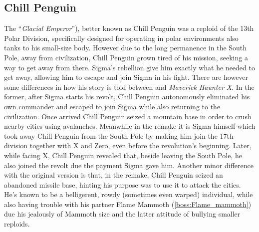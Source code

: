 \subsection{Chill Penguin}\label{boss:Chill_Penguin}
The ``\textit{Glacial Emperor}''\cite{book:MMX_Complete_art}), better known as Chill Penguin was a reploid of the 13th Polar Division, specifically designed for operating in polar environments also tanks to his small-size body. However due to the long permanence in the South Pole, away from civilization, Chill Penguin grown tired of his mission, seeking a way to get away from there. Sigma's rebellion give him exactly what he needed to get away, allowing him to escape and join Sigma in his fight. There are however some differences in how his story is told between \x and \textit{Maverick Haunter X}. In the former, after Sigma starts his revolt, Chill Penguin autonomously eliminated his own commander and escaped to join Sigma while also returning to the civilization\cite{Xcoll1:Manual_X1}. Once arrived Chill Penguin seized a mountain base in order to crush nearby cities using avalanches. Meanwhile in the remake it is Sigma himself which took away Chill Penguin from the South Pole by making him join the 17th division together with X and Zero, even before the revolution's beginning\cite{MHX:manual}. Later, while facing X, Chill Penguin revealed that, beside leaving the South Pole, he also joined the revolt due the payment Sigma gave him\cite{wiki:MMX_script}. Another minor difference with the original version is that, in the remake, Chill Penguin seized an abandoned missile base, hinting his purpose was to use it to attack the cities. He's known to be a belligerent, rowdy (sometimes even warped) individual, while also having trouble with his partner Flame Mammoth (\ref{boss:Flame_mammoth}) due his jealously of Mammoth size and the latter attitude of bullying smaller reploids.


